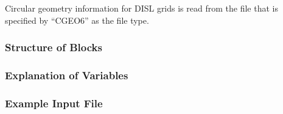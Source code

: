 Circular geometry information for DISL grids is read from the file that is specified by ``CGEO6'' as the file type.  

\vspace{5mm}
\subsubsection{Structure of Blocks}




\vspace{5mm}
\subsubsection{Explanation of Variables}
\begin{description}

\end{description}

\vspace{5mm}
\subsubsection{Example Input File}

